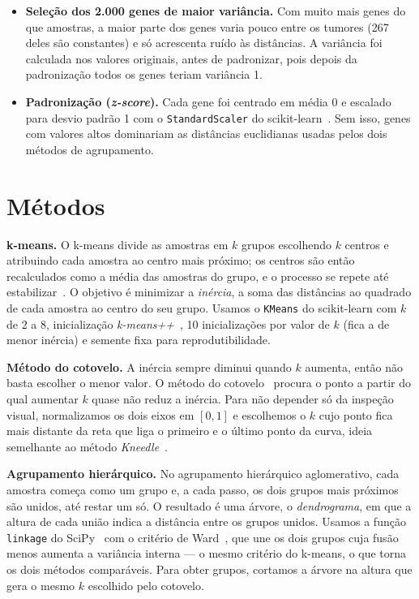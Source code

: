 \documentclass[11pt,a4paper]{article}
\begin{document}
\begin{itemize}\setlength{\itemsep}{1pt}
  \item \textbf{Seleção dos 2.000 genes de maior variância.} Com muito mais genes do que amostras, a maior
    parte dos genes varia pouco entre os tumores (267 deles são constantes) e só acrescenta ruído às
    distâncias. A variância foi calculada nos valores originais, antes de padronizar, pois depois da
    padronização todos os genes teriam variância 1.
  \item \textbf{Padronização (\emph{z-score}).} Cada gene foi centrado em média 0 e escalado para desvio padrão 1
    com o \texttt{StandardScaler} do scikit-learn~\cite{sklearn}. Sem isso, genes com valores altos dominariam
    as distâncias euclidianas usadas pelos dois métodos de agrupamento.
\end{itemize}



\section{Métodos}

\textbf{k-means.} O k-means divide as amostras em $k$ grupos escolhendo $k$ centros e atribuindo cada amostra
ao centro mais próximo; os centros são então recalculados como a média das amostras do grupo, e o processo
se repete até estabilizar~\cite{lloyd}. O objetivo é minimizar a \emph{inércia}, a soma das distâncias ao
quadrado de cada amostra ao centro do seu grupo. Usamos o \texttt{KMeans} do scikit-learn com $k$ de 2 a 8,
inicialização \emph{k-means++}~\cite{kmeanspp}, 10 inicializações por valor de $k$ (fica a de menor inércia)
e semente fixa para reprodutibilidade.

\textbf{Método do cotovelo.} A inércia sempre diminui quando $k$ aumenta, então não basta escolher o menor
valor. O método do cotovelo~\cite{thorndike} procura o ponto a partir do qual aumentar $k$ quase não reduz a
inércia. Para não depender só da inspeção visual, normalizamos os dois eixos em $[0,1]$ e escolhemos o $k$
cujo ponto fica mais distante da reta que liga o primeiro e o último ponto da curva, ideia semelhante ao
método \emph{Kneedle}~\cite{kneedle}.

\textbf{Agrupamento hierárquico.} No agrupamento hierárquico aglomerativo, cada amostra começa como um grupo
e, a cada passo, os dois grupos mais próximos são unidos, até restar um só. O resultado é uma árvore, o
\emph{dendrograma}, em que a altura de cada união indica a distância entre os grupos unidos. Usamos a função
\texttt{linkage} do SciPy~\cite{scipy} com o critério de Ward~\cite{ward}, que une os dois grupos cuja fusão
menos aumenta a variância interna --- o mesmo critério do k-means, o que torna os dois métodos comparáveis.
Para obter grupos, cortamos a árvore na altura que gera o mesmo $k$ escolhido pelo cotovelo.
\end{document}
